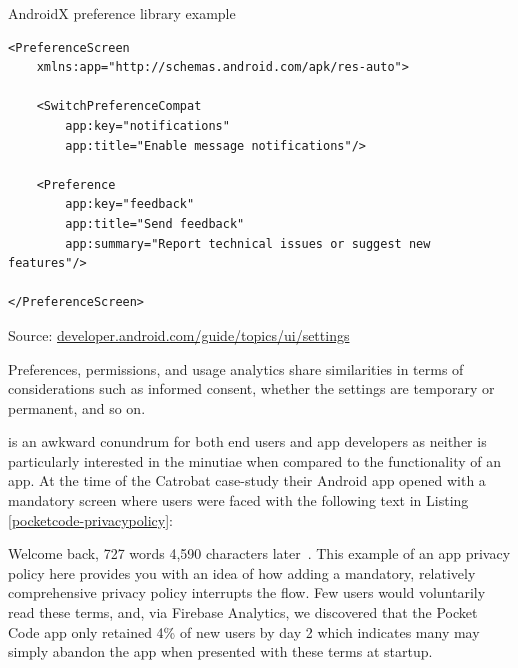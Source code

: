 \begin{listing}[H]
\caption{AndroidX preference library example} \label{code:androidx_preferences_example}
\begin{verbatim}
<PreferenceScreen
    xmlns:app="http://schemas.android.com/apk/res-auto">

    <SwitchPreferenceCompat
        app:key="notifications"
        app:title="Enable message notifications"/>

    <Preference
        app:key="feedback"
        app:title="Send feedback"
        app:summary="Report technical issues or suggest new features"/>

</PreferenceScreen>
\end{verbatim}
Source: {\small \href{https://developer.android.com/guide/topics/ui/settings}{developer.android.com/guide/topics/ui/settings}}
\end{listing}


Preferences, permissions, and usage analytics share similarities in terms of considerations such as informed consent, whether the settings are temporary or permanent, and so on.


is an awkward conundrum for both end users and app developers as neither is particularly interested in the minutiae when compared to the functionality of an app.  
At the time of the Catrobat case-study their Android app opened with a mandatory screen where users were faced with the following text in Listing \ref{pocketcode-privacypolicy}:



Welcome back, 727 words 4,590 characters later~. This example of an app privacy policy here provides you with an idea of how adding a mandatory, relatively comprehensive privacy policy interrupts the flow. %
Few users would voluntarily read these terms, and, via Firebase Analytics, we discovered that the Pocket Code app only retained 4\% of new users by day 2 which indicates many may simply abandon the app when presented with these terms at startup.  %

